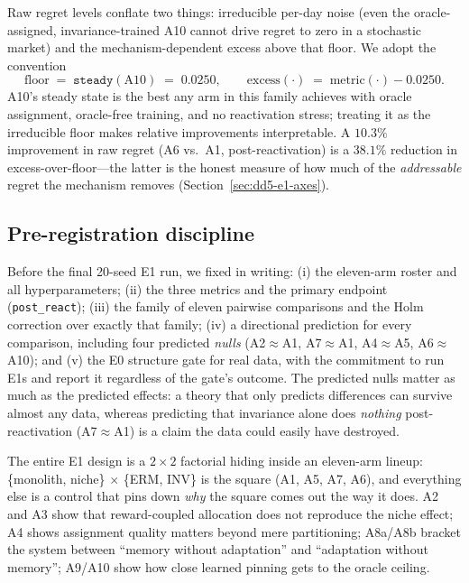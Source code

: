\documentclass[11pt,a4paper]{article}
\theoremstyle{definition}
\theoremstyle{plain}
\begin{document}
Raw regret levels conflate two things: irreducible per-day noise (even the
oracle-assigned, invariance-trained A10 cannot drive regret to zero in a
stochastic market) and the mechanism-dependent excess above that floor. We
adopt the convention
\begin{equation}
\text{floor} \;=\; \texttt{steady}(\text{A10}) \;=\; 0.0250, \qquad
\text{excess}(\cdot) \;=\; \text{metric}(\cdot) - 0.0250.
\label{eq:dd5-floor}
\end{equation}
A10's steady state is the best any arm in this family achieves with oracle
assignment, oracle-free training, and no reactivation stress; treating it as
the irreducible floor makes relative improvements interpretable. A $10.3\%$
improvement in raw regret (A6 vs.\ A1, post-reactivation) is a $38.1\%$
reduction in excess-over-floor---the latter is the honest measure of how much
of the \emph{addressable} regret the mechanism removes
(Section~\ref{sec:dd5-e1-axes}).

\subsection{Pre-registration discipline}
\label{sec:dd5-prereg}

Before the final 20-seed E1 run, we fixed in writing: (i) the eleven-arm
roster and all hyperparameters; (ii) the three metrics and the primary
endpoint (\texttt{post\_react}); (iii) the family of eleven pairwise
comparisons and the Holm correction over exactly that family; (iv) a
directional prediction for every comparison, including four predicted
\emph{nulls} (A2$\approx$A1, A7$\approx$A1, A4$\approx$A5,
A6$\approx$A10); and (v) the E0 structure gate for real data, with the
commitment to run E1s and report it regardless of the gate's outcome. The
predicted nulls matter as much as the predicted effects: a theory that only
predicts differences can survive almost any data, whereas predicting that
invariance alone does \emph{nothing} post-reactivation (A7$\approx$A1) is a
claim the data could easily have destroyed.

\begin{intuition}
The entire E1 design is a $2\times 2$ factorial hiding inside an eleven-arm
lineup: \{monolith, niche\} $\times$ \{ERM, INV\} is the square
(A1, A5, A7, A6), and everything else is a control that pins down \emph{why}
the square comes out the way it does. A2 and A3 show that reward-coupled
allocation does not reproduce the niche effect; A4 shows assignment quality
matters beyond mere partitioning; A8a/A8b bracket the system between
``memory without adaptation'' and ``adaptation without memory''; A9/A10 show
how close learned pinning gets to the oracle ceiling.
\end{intuition}
\end{document}
